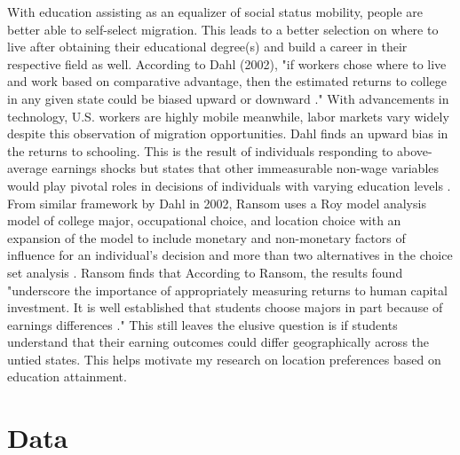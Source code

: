 \documentclass[12pt, English]{article}
\begin{document}
With education assisting as an equalizer of social status mobility, people are better able to self-select migration. This leads to a better selection on where to live after obtaining their educational degree(s) and build a career in their respective field as well. According to Dahl (2002), "if workers chose where to live and work based on comparative advantage, then the estimated returns to college in any given state could be biased upward or downward \citep{dahl2002mobility}." With advancements in technology, U.S. workers are highly mobile meanwhile, labor markets vary widely despite this observation of migration opportunities. Dahl finds an upward bias in the returns to schooling. This is the result of individuals responding to above-average earnings shocks but states that other immeasurable non-wage variables would play pivotal roles in decisions of individuals with varying education levels \citep{dahl2002mobility}. From similar framework by Dahl in 2002, Ransom uses a Roy model analysis model of college major, occupational choice, and location choice with an expansion of the model to include monetary and non-monetary factors of influence for an individual’s decision and more than two alternatives in the choice set analysis \citep{ransom2020selective}. Ransom finds that According to Ransom, the results found "underscore the importance of appropriately measuring returns to
human capital investment. It is well established that students choose majors in part
because of earnings differences \citep{ransom2020selective}." This still leaves the elusive question is if students understand that their earning outcomes could differ geographically across the untied states. This helps motivate my research on location preferences based on education attainment. 

\section{Data}
\end{document}
